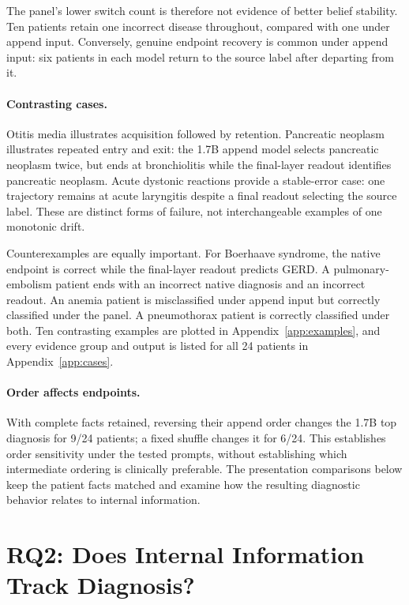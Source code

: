 \documentclass[11pt]{article}
\begin{document}
The panel's lower switch count is therefore not evidence of better belief stability. Ten patients retain one incorrect disease throughout, compared with one under append input. Conversely, genuine endpoint recovery is common under append input: six patients in each model return to the source label after departing from it.

\paragraph{Contrasting cases.}
Otitis media illustrates acquisition followed by retention. Pancreatic neoplasm illustrates repeated entry and exit: the 1.7B append model selects pancreatic neoplasm twice, but ends at bronchiolitis while the final-layer readout identifies pancreatic neoplasm. Acute dystonic reactions provide a stable-error case: one trajectory remains at acute laryngitis despite a final readout selecting the source label. These are distinct forms of failure, not interchangeable examples of one monotonic drift.

Counterexamples are equally important. For Boerhaave syndrome, the native endpoint is correct while the final-layer readout predicts GERD. A pulmonary-embolism patient ends with an incorrect native diagnosis and an incorrect readout. An anemia patient is misclassified under append input but correctly classified under the panel. A pneumothorax patient is correctly classified under both. Ten contrasting examples are plotted in Appendix~\ref{app:examples}, and every evidence group and output is listed for all 24 patients in Appendix~\ref{app:cases}.

\paragraph{Order affects endpoints.}
With complete facts retained, reversing their append order changes the 1.7B top diagnosis for 9/24 patients; a fixed shuffle changes it for 6/24. This establishes order sensitivity under the tested prompts, without establishing which intermediate ordering is clinically preferable. The presentation comparisons below keep the patient facts matched and examine how the resulting diagnostic behavior relates to internal information.

\section{RQ2: Does Internal Information Track Diagnosis?}
\label{sec:representation}
\end{document}
